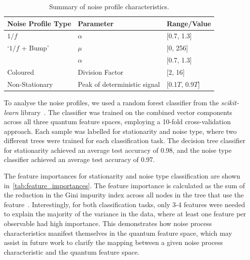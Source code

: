 \documentclass[12pt]{iopart}
\begin{document}
\begin{table}[h!]
    \centering
    \begin{tabular}{|l|l|l|}
        \hline
        \textbf{Noise Profile Type} & \textbf{Parameter}           & \textbf{Range/Value} \\ \hline
        $1/f$                 & $\alpha$                     & [0.7, 1.3]           \\ \hline
 `$1/f$ + Bump'       & $\mu$                        & [0, 256]             \\ \cline{2-3}
                                    & $\alpha$                     & [0.7, 1.3]           \\ \hline
 Coloured              & Division Factor              & [2, 16]              \\ \hline
 Non-Stationary              & Peak of deterministic signal & [0.1$T$, 0.9$T$]     \\ \hline
    \end{tabular}
    \caption{Summary of noise profile characteristics.}
    \label{tab:noise_params}
\end{table}

To analyse the noise profiles, we used a random forest classifier from the \textit{scikit-learn} library~\cite{scikit-learn}. The classifier was trained on the combined vector components across all three quantum feature spaces, employing a 10-fold cross-validation approach. Each sample was labelled for stationarity and noise type, where two different trees were trained for each classification task. The decision tree classifier for stationarity achieved an average test accuracy of 0.98, and the noise type classifier achieved an average test accuracy of 0.97.

The feature importances for stationarity and noise type classification are shown in~\cref{tab:feature_importances}. The feature importance is calculated as the sum of the reduction in the Gini impurity index across all nodes in the tree that use the feature~\cite{scikit-learn}. Interestingly, for both classification tasks, only 3-4 features were needed to explain the majority of the variance in the data, where at least one feature per observable had high importance. This demonstrates how noise process characteristics manifest themselves in the quantum feature space, which may assist in future work to clarify the mapping between a given noise process characteristic and the quantum feature space.
\end{document}
